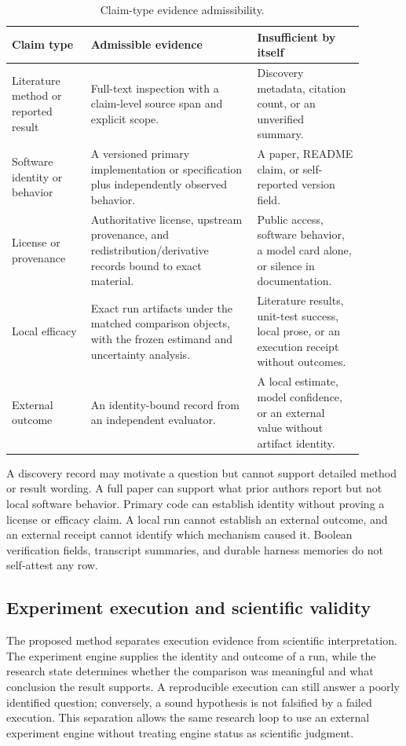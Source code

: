 \documentclass[11pt,a4paper]{article}
\begin{document}
\begin{table}[ht]
\centering
\small
\caption{Claim-type evidence admissibility.}
\label{tab:admissibility}
\begin{tabular}{p{0.20\linewidth} p{0.42\linewidth} p{0.27\linewidth}}
\toprule
Claim type & Admissible evidence & Insufficient by itself \\
\midrule
Literature method or reported result & Full-text inspection with a claim-level
source span and explicit scope. & Discovery metadata, citation count, or an
unverified summary. \\
Software identity or behavior & A versioned primary implementation or
specification plus independently observed behavior. & A paper, README claim, or
self-reported version field. \\
License or provenance & Authoritative license, upstream provenance, and
redistribution/derivative records bound to exact material. & Public access,
software behavior, a model card alone, or silence in documentation. \\
Local efficacy & Exact run artifacts under the matched comparison objects,
with the frozen estimand and uncertainty analysis. & Literature results,
unit-test success, local prose, or an execution receipt without outcomes. \\
External outcome & An identity-bound record from an independent evaluator. & A
local estimate, model confidence, or an external value without artifact
identity. \\
\bottomrule
\end{tabular}
\end{table}

A discovery record may motivate a question but cannot support detailed method
or result wording.  A full paper can support what prior authors report but not
local software behavior.  Primary code can establish identity without proving a
license or efficacy claim.  A local run cannot establish an external outcome,
and an external receipt cannot identify which mechanism caused it.  Boolean
verification fields, transcript summaries, and durable harness memories do not
self-attest any row.

\subsection{Experiment execution and scientific validity}

The proposed method separates execution evidence from scientific interpretation.  The
experiment engine supplies the identity and outcome of a run, while the research
state determines whether the comparison was meaningful and what conclusion the
result supports.  A reproducible execution can still answer a poorly identified
question; conversely, a sound hypothesis is not falsified by a failed execution.
This separation allows the same research loop to use an external experiment
engine without treating engine status as scientific judgment.
\end{document}
